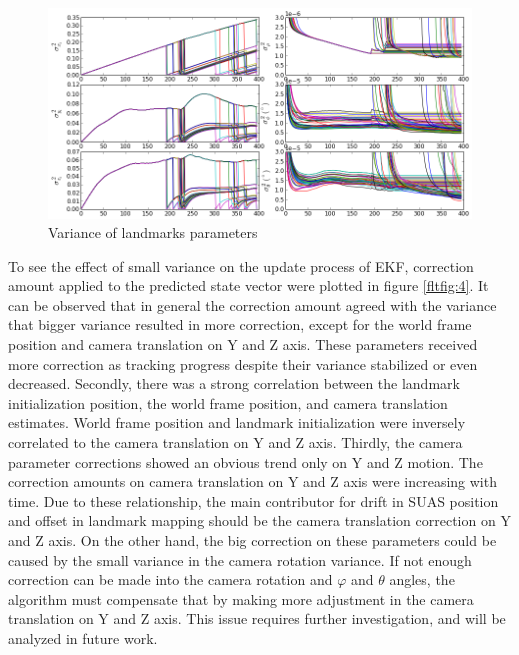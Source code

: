 \begin{figure}[h]
\centering
\includegraphics[width=14cm, keepaspectratio=true]
{./Figures/fltfig/cut1/Figure40.png}
\caption{Variance of landmarks parameters}
\label{fltfig:3}
\end{figure}
\FloatBarrier

To see the effect of small variance on the update process of EKF, correction
amount applied to the predicted state vector were plotted in figure
\ref{fltfig:4}. It can be observed that in general the correction
amount agreed with the variance that bigger variance resulted in more
correction, except for the world frame position and camera translation
on Y and Z axis. These parameters received more correction as tracking
progress despite their variance stabilized or even decreased.
Secondly, there was a strong correlation between the landmark
initialization position, the world frame position, and camera
translation estimates. World frame position and landmark
initialization were inversely correlated to the camera translation on Y
and Z axis. Thirdly, the camera parameter corrections showed an
obvious trend only on Y and Z motion. The correction amounts on camera
translation on Y and Z axis were increasing with time. Due to these
relationship, the main contributor for drift in SUAS position and
offset in landmark mapping should be the camera translation correction
on Y and Z axis. On the other hand, the big correction on these
parameters could be caused by the small variance in the camera
rotation variance. If not enough correction can be made into the
camera rotation and $\varphi$ and $\theta$ angles, the algorithm must
compensate that by making more adjustment in the camera translation on Y
and Z axis. This issue requires further investigation, and will be analyzed
in future work.

